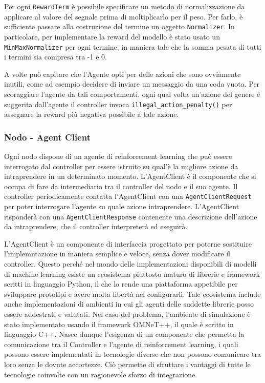 \documentclass[conference]{IEEEtran}
\newcommand{\code}[1]{\texttt{#1}}
\begin{document}
Per ogni \code{RewardTerm} è possibile specificare un metodo di normalizzazione da
applicare al valore del segnale prima di moltiplicarlo per il peso. Per farlo, è
sufficiente passare alla costruzione del termine un oggetto \code{Normalizer}. In
particolare, per implementare la reward del modello è stato usato un
\code{MinMaxNormalizer} per ogni termine, in maniera tale che la somma pesata di tutti i termini sia compresa tra -1 e 0.

A volte può capitare che l'Agente opti per delle azioni che sono ovviamente inutili,
come ad esempio decidere di inviare un messaggio da una coda vuota. Per scoraggiare
l'agente da tali comportamenti, ogni qual volta un'azione del genere è suggerita
dall'agente il controller invoca \code{illegal\_action\_penalty()} per assegnare
la reward più negativa possibile a tale azione. 

\subsubsection{Nodo - Agent Client}
Ogni nodo dispone di un agente di reinforcement learning che può essere interrogato
dal controller per essere istruito su qual'è la migliore azione da intraprendere in un
determinato momento. L'AgentClient è il componente che si occupa di fare da intermediario
tra il controller del nodo e il suo agente. Il controller periodicamente contatta
 l'AgentClient con una \code{AgentClientRequest}
per poter interrogare l'agente
su quale azione intraprendere. L'AgentClient risponderà con una
\code{AgentClientResponse} contenente una descrizione dell'azione da intraprendere,
che il controller interpreterà ed eseguirà.

L'AgentClient è un componente di interfaccia progettato per poterne sostituire 
l'implemntazione in maniera semplice e veloce, senza dover modificare il controller.
Questo perché nel mondo delle implementazioni disponibili di modelli di machine learning
 esiste un 
ecosistema piuttosto maturo di librerie e framework scritti in linguaggio Python, il
che lo rende una piattaforma appetibile per sviluppare prototipi e avere molta libertà
nel configurarli. Tale ecosistema include anche implementazioni di ambienti in cui
gli agenti delle suddette librerie posso essere addestrati e valutati. Nel caso del
problema, l'ambiente di simulazione è stato implementato usando il framework OMNeT++,
il quale è scritto in linguaggio C++. Nasce dunque l'esigenza di un componente che 
permetta la comunicazione tra il Controller e l'agente di reinforcement learning, i
quali possono essere implementati in tecnologie diverse che non possono comunicare
tra loro senza le dovute accortezze. Ciò permette di sfruttare i vantaggi di tutte le
tecnologie coinvolte con un ragionevole sforzo di integrazione.
\end{document}
